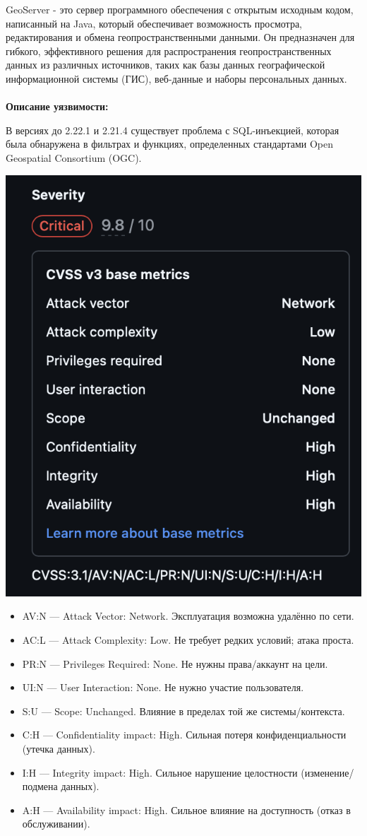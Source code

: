 \documentclass{article}
\begin{document}
GeoServer - это сервер программного обеспечения с открытым исходным кодом, написанный на Java, который обеспечивает возможность просмотра, редактирования и обмена геопространственными данными. Он предназначен для гибкого, эффективного решения для распространения геопространственных данных из различных источников, таких как базы данных географической информационной системы (ГИС), веб-данные и наборы персональных данных.
\\ \\ 
\textbf{Описание уязвимости:}

В версиях до 2.22.1 и 2.21.4 существует проблема с SQL-инъекцией, которая была обнаружена в фильтрах и функциях, определенных стандартами Open Geospatial Consortium (OGC).

\begin{center}
  \includegraphics[width=.4\textwidth]{desc.png}
\end{center}

\begin{itemize}
  \item AV:N — Attack Vector: Network. Эксплуатация возможна удалённо по сети.
  \item AC:L — Attack Complexity: Low. Не требует редких условий; атака проста.
  \item PR:N — Privileges Required: None. Не нужны права/аккаунт на цели.
  \item UI:N — User Interaction: None. Не нужно участие пользователя.
  \item S:U — Scope: Unchanged. Влияние в пределах той же системы/контекста.
  \item C:H — Confidentiality impact: High. Сильная потеря конфиденциальности (утечка данных).
  \item I:H — Integrity impact: High. Сильное нарушение целостности (изменение/подмена данных).
  \item A:H — Availability impact: High. Сильное влияние на доступность (отказ в обслуживании).
\end{itemize}
\end{document}
